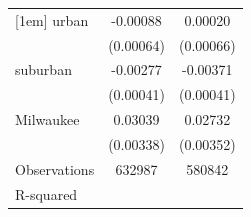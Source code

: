 {\begin{tabular}{l*{2}{c}}
[1em]
urban               &    -0.00088         &     0.00020         \\
                    &   (0.00064)         &   (0.00066)         \\
[1em]
suburban            &    -0.00277\sym{***}&    -0.00371\sym{***}\\
                    &   (0.00041)         &   (0.00041)         \\
[1em]
Milwaukee           &     0.03039\sym{***}&     0.02732\sym{***}\\
                    &   (0.00338)         &   (0.00352)         \\
\hline
Observations        &      632987         &      580842         \\
R-squared           &                     &                     \\
\hline\hline
\end{tabular}
}
